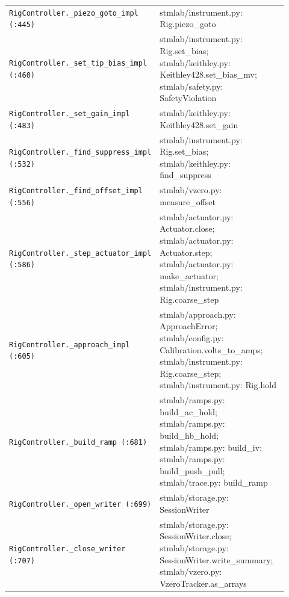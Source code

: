 \begin{longtable}{@{}>{\raggedright\arraybackslash}p{0.280\linewidth}>{\raggedright\arraybackslash}p{0.640\linewidth}@{}}
\texttt{Rig\discretionary{}{}{}Controller.\discretionary{}{}{}\_\discretionary{}{}{}piezo\_\discretionary{}{}{}goto\_\discretionary{}{}{}impl (:445)} & stmlab/instrument.py: Rig.piezo\_goto \\
\texttt{Rig\discretionary{}{}{}Controller.\discretionary{}{}{}\_\discretionary{}{}{}set\_\discretionary{}{}{}tip\_\discretionary{}{}{}bias\_\discretionary{}{}{}impl (:460)} & stmlab/instrument.py: Rig.set\_bias; stmlab/keithley.py: Keithley428.set\_bias\_mv; stmlab/safety.py: SafetyViolation \\
\texttt{Rig\discretionary{}{}{}Controller.\discretionary{}{}{}\_\discretionary{}{}{}set\_\discretionary{}{}{}gain\_\discretionary{}{}{}impl (:483)} & stmlab/keithley.py: Keithley428.set\_gain \\
\texttt{Rig\discretionary{}{}{}Controller.\discretionary{}{}{}\_\discretionary{}{}{}find\_\discretionary{}{}{}suppress\_\discretionary{}{}{}impl (:532)} & stmlab/instrument.py: Rig.set\_bias; stmlab/keithley.py: find\_suppress \\
\texttt{Rig\discretionary{}{}{}Controller.\discretionary{}{}{}\_\discretionary{}{}{}find\_\discretionary{}{}{}offset\_\discretionary{}{}{}impl (:556)} & stmlab/vzero.py: measure\_offset \\
\texttt{Rig\discretionary{}{}{}Controller.\discretionary{}{}{}\_\discretionary{}{}{}step\_\discretionary{}{}{}actuator\_\discretionary{}{}{}impl (:586)} & stmlab/actuator.py: Actuator.close; stmlab/actuator.py: Actuator.step; stmlab/actuator.py: make\_actuator; stmlab/instrument.py: Rig.coarse\_step \\
\texttt{Rig\discretionary{}{}{}Controller.\discretionary{}{}{}\_\discretionary{}{}{}approach\_\discretionary{}{}{}impl (:605)} & stmlab/approach.py: ApproachError; stmlab/config.py: Calibration.volts\_to\_amps; stmlab/instrument.py: Rig.coarse\_step; stmlab/instrument.py: Rig.hold \\
\texttt{Rig\discretionary{}{}{}Controller.\discretionary{}{}{}\_\discretionary{}{}{}build\_\discretionary{}{}{}ramp (:681)} & stmlab/ramps.py: build\_ac\_hold; stmlab/ramps.py: build\_hb\_hold; stmlab/ramps.py: build\_iv; stmlab/ramps.py: build\_push\_pull; stmlab/trace.py: build\_ramp \\
\texttt{Rig\discretionary{}{}{}Controller.\discretionary{}{}{}\_\discretionary{}{}{}open\_\discretionary{}{}{}writer (:699)} & stmlab/storage.py: SessionWriter \\
\texttt{Rig\discretionary{}{}{}Controller.\discretionary{}{}{}\_\discretionary{}{}{}close\_\discretionary{}{}{}writer (:707)} & stmlab/storage.py: SessionWriter.close; stmlab/storage.py: SessionWriter.write\_summary; stmlab/vzero.py: VzeroTracker.as\_arrays \\

\end{longtable}
